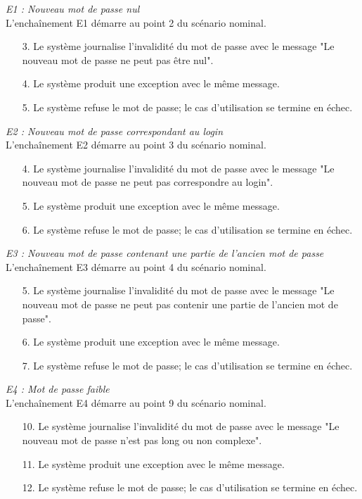 \textit{E1 : Nouveau mot de passe nul}\\
L’enchaînement E1 démarre au point 2 du scénario nominal.
\begin{itemize}
	\item[3.] Le système journalise l'invalidité du mot de passe avec le message "Le nouveau mot de passe ne peut pas être nul".
	\item[4.] Le système produit une exception avec le même message.
	\item[5.] Le système refuse le mot de passe; le cas d'utilisation se termine en échec.
\end{itemize}
\textit{E2 : Nouveau mot de passe correspondant au login}\\
L’enchaînement E2 démarre au point 3 du scénario nominal.
\begin{itemize}
	\item[4.] Le système journalise l'invalidité du mot de passe avec le message "Le nouveau mot de passe ne peut pas correspondre au login".
	\item[5.] Le système produit une exception avec le même message.
	\item[6.] Le système refuse le mot de passe; le cas d'utilisation se termine en échec.
\end{itemize}
\textit{E3 : Nouveau mot de passe contenant une partie de l'ancien mot de passe}\\
L’enchaînement E3 démarre au point 4 du scénario nominal.
\begin{itemize}
	\item[5.] Le système journalise l'invalidité du mot de passe avec le message "Le nouveau mot de passe ne peut pas contenir une partie de l'ancien mot de passe".
	\item[6.] Le système produit une exception avec le même message.
	\item[7.] Le système refuse le mot de passe; le cas d'utilisation se termine en échec.
\end{itemize}
\textit{E4 : Mot de passe faible}\\
L’enchaînement E4 démarre au point 9 du scénario nominal.
\begin{itemize}
	\item[10.] Le système journalise l'invalidité du mot de passe avec le message "Le nouveau mot de passe n'est pas long ou non complexe".
	\item[11.] Le système produit une exception avec le même message.
	\item[12.] Le système refuse le mot de passe; le cas d'utilisation se termine en échec.
\end{itemize}
